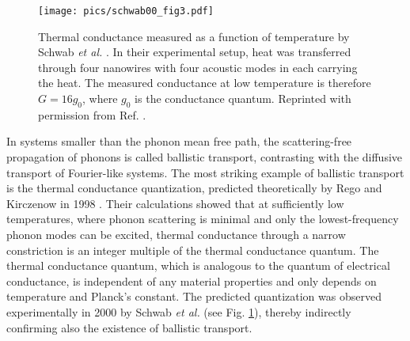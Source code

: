 

\begin{figure}
\begin{center}
 \texttt{[image: pics/schwab00\_fig3.pdf]}
 \caption{Thermal conductance measured as a function of temperature by Schwab \textit{et al.} \cite{schwab00}. In their experimental setup, heat was transferred through four nanowires with four acoustic modes in each carrying the heat. The measured conductance at low temperature is therefore $G=16g_0$, where $g_0$ is the conductance quantum. Reprinted with permission from Ref. \cite{schwab00}.}
\label{fig:intro_schwab}
\end{center}
\end{figure}

In systems smaller than the phonon mean free path, the scattering-free propagation of phonons is called ballistic transport, contrasting with the diffusive transport of Fourier-like systems. The most striking example of ballistic transport is the thermal conductance quantization, predicted theoretically by Rego and Kirczenow in 1998 \cite{rego98}. Their calculations showed that at sufficiently low temperatures, where phonon scattering is minimal and only the lowest-frequency phonon modes can be excited, thermal conductance through a narrow constriction is an integer multiple of the thermal conductance quantum. The thermal conductance quantum, which is analogous to the quantum of electrical conductance, is independent of any material properties and only depends on temperature and Planck's constant. The predicted quantization was observed experimentally in 2000 by Schwab \textit{et al.} \cite{schwab00} (see Fig. \ref{fig:intro_schwab}), thereby indirectly confirming also the existence of ballistic transport.

